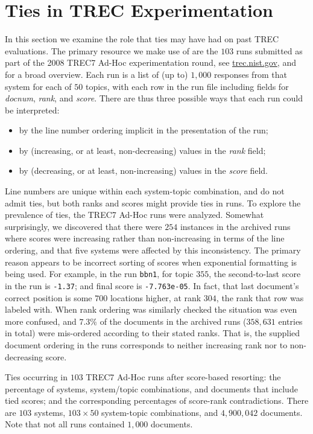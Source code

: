 \section{Ties in TREC Experimentation}
\label{sec-trecimpact}


In this section we examine the role that ties may have had on past
TREC evaluations.
The primary resource we make use of are the $103$ runs submitted as
part of the 2008 TREC7 Ad-Hoc experimentation round, see
{\small\url{trec.nist.gov}}, and {\citet{harman05trecbook}} for a
broad overview.
Each run is a list of (up to) $1{,}000$ responses from that system
for each of $50$ topics, with each row in the run file including
fields for {\emph{docnum}}, {\emph{rank}}, and {\emph{score}}.
There are thus three possible ways that each run could be
interpreted:
\begin{itemize}
\item
by the line number ordering implicit in the presentation of the run;
\item
by (increasing, or at least, non-decreasing) values in the
{\emph{rank}} field;
\item
by (decreasing, or at least, non-increasing) values in the
{\emph{score}} field.
\end{itemize}
Line numbers are unique within each system-topic combination, and do
not admit ties, but both ranks and scores might provide ties in runs.
To explore the prevalence of ties, the TREC7 Ad-Hoc runs were
analyzed.
Somewhat surprisingly, we discovered that there were $254$ instances
in the archived runs where scores were increasing rather than
non-increasing in terms of the line ordering, and that five systems
were affected by this inconsistency.
The primary reason appears to be incorrect sorting of scores when
exponential formatting is being used.
For example, in the run {\tt{bbn1}}, for topic $355$, the
second-to-last score in the run is {\tt{-1.37}}; and final score is
{\tt{-7.763e-05}}.
In fact, that last document's correct position is some $700$
locations higher, at rank $304$, the rank that row was labeled with.
When rank ordering was similarly checked the situation was even more
confused, and $7.3$\% of the documents in the archived runs
($358{,}631$ entries in total) were mis-ordered according to their
stated ranks.
That is, the supplied document ordering in the runs corresponds to
neither increasing rank nor to non-decreasing score.

\begin{table}[t!]
\centering

\renewcommand{\tabcolsep}{0.5em}
\caption{Ties occurring in $103$ TREC7 Ad-Hoc runs after score-based
resorting: the percentage of systems, system/topic combinations, and
documents that include tied scores; and the corresponding percentages
of score-rank contradictions.
There are $103$ systems, $103\times50$ system-topic
combinations, and $4{,}900{,}042$ documents.
Note that not all runs contained $1{,}000$ documents.
\label{tbl-trec7-ties}}
\end{table}

